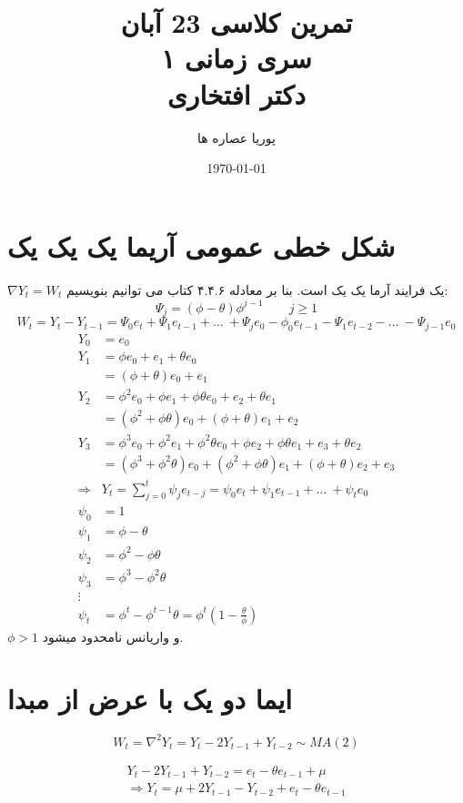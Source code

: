 \documentclass[a5paper,10pt]{article}
\author{پوریا عصاره ها}
\title{
    تمرین کلاسی 23 آبان\\
    سری زمانی ۱ \\
    دکتر افتخاری
}
\date{\today}
\begin{document}
\maketitle

\section{شکل خطی عمومی آریما یک یک یک }
$\nabla Y_t = W_t$ یک فرایند آرما یک یک است.
بنا بر معادله ۴.۴.۶ کتاب می توانیم بنویسیم:
\[ \Psi_j = (\phi - \theta) \phi^{j-1} \qquad j \ge 1 \]
\[ W_t = Y_t - Y_{t-1} = \Psi_0 e_t + \Psi_1 e_{t-1} + \dots\ + \Psi_j e_0 - \phi_0 e_{t-1} - \Psi_1 e_{t-2} - \dots\ - \Psi_{j-1}e_0 \]
\begin{align*}
    Y_0 & = e_0 \\
    Y_1 & = \phi e_0 + e_1 + \theta e_0 \\
        & = (\phi + \theta) e_0 + e_1 \\
    Y_2 & = \phi^2 e_0 + \phi e_1 + \phi\theta e_0 + e_2 + \theta e_1  \\
        & = (\phi^2 + \phi\theta)e_0 + (\phi + \theta)e_1 + e_2 \\
    Y_3 & = \phi^3 e_0 + \phi^2 e_1 + \phi^2\theta e_0 + \phi e_2 + \phi \theta e_1 + e_3 + \theta e_2 \\
        & = (\phi^3 + \phi^2\theta )e_0 + (\phi^2 + \phi \theta)e_1 + (\phi + \theta)e_2 + e_3 \\
    \Rightarrow & Y_t = \sum_{j=0}^t \psi_j e_{t-j} = \psi_0 e_t + \psi_1 e_{t-1} + \dots\ + \psi_t e_0 \\
    \psi_0 & = 1  \\ 
    \psi_1 & = \phi - \theta \\
    \psi_2 & = \phi^2 - \phi \theta \\
    \psi_3 & = \phi^3 - \phi^2 \theta \\
    \vdots \\
    \psi_t & = \phi^t - \phi^{t-1} \theta = \phi^t(1-\frac{\theta}{\phi})
\end{align*}
$\phi > 1$ 
و واریانس نامحدود میشود.
\newpage
\section{ایما  دو یک با عرض از مبدا }

\[ W_t = \nabla^2 Y_t = Y_t - 2Y_{t-1} + Y_{t-2} \sim MA(2) \]

\begin{multline*}
    Y_t - 2Y_{t-1} + Y_{t-2} =  e_t - \theta e_{t-1} + \mu\\
    \Rightarrow Y_t = \mu + 2Y_{t-1} - Y_{t-2} + e_t - \theta e_{t-1} 
\end{multline*}
\end{document}
